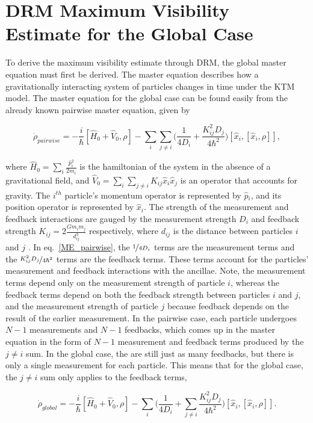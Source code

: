\documentclass[aps, prd, superscriptaddress,twocolumn,amsmath,amssymb,nofootinbib]{revtex4-1}
\newcommand{\beq}{\begin{equation}}
\newcommand{\eeq}{\end{equation}}
\newcommand{\h}[1]{\hat#1{}}
\begin{document}

\section{DRM Maximum Visibility Estimate for the Global Case}

To derive the maximum visibility estimate through DRM, the global master equation must first be derived. The master equation describes how a gravitationally interacting system of particles changes in time under the KTM model. The master equation for the global case can be found easily from the already known pairwise master equation, given by

\beq
 \dot\rho_{pairwise} = -\frac{i}{\hbar}[\h H_0+\h V_0, \rho] 
 -\sum_{i} \sum_{j\neq i}\bigg(\frac{1}{4D_i}+\frac{K_{ij}^2D_j}{4\hbar^2}\bigg)[\h x_i, [\h x_i,\rho]],
 \label{ME_pairwise}
 \eeq

where $\h H_0 = \sum_{i}\frac{\h p_i^2}{2m_i}$ is the hamiltonian of the system in the absence of a gravitational field, and $\h V_0 = \sum_{i}\sum_{j\neq i} K_{ij}\h x_i \h x_j$ is an operator that accounts for gravity. The $i^{th}$ particle's momentum operator is represented by $\h p_i$, and its position operator is represented by $\h x_i$. The strength of the measurement and feedback interactions are gauged by the measurement strength $D_i$ and feedback strength $K_{ij} = 2\frac{Gm_{i}m_{j}}{d_{ij}^3}$ respectively, where $d_{ij}$ is the distance between particles $i$ and $j$ \cite{P3}. In eq.~\eqref{ME_pairwise}, the $\nicefrac{1}{4D_i}$ terms are the measurement terms and the $\nicefrac{K_{ij}^2D_j}{4\hbar^2}$ terms are the feedback terms. These terms account for the particles' measurement and feedback interactions with the ancillae. Note, the measurement terms depend only on the measurement strength of particle $i$, whereas the feedback terms depend on both the feedback strength between particles $i$ and $j$, and the measurement strength of particle $j$ because feedback depends on the result of the earlier measurement.
In the pairwise case, each particle undergoes $N-1$ measurements and $N-1$ feedbacks, which comes up in the master equation in the form of $N-1$ measurement and feedback terms produced by the $j\neq i$ sum. In the global case, the are still just as many feedbacks, but there is only a single measurement for each particle. This means that for the global case, the $j \neq i$ sum only applies to the feedback terms,

\beq
 \dot\rho_{global} = -\frac{i}{\hbar}[\h H_0+\h V_0, \rho] 
 -\sum_{i} \bigg(\frac{1}{4D_i}+\sum_{j\neq i}\frac{K_{ij}^2D_j}{4\hbar^2}\bigg)[\h x_i, [\h x_i,\rho]].
  \label{ME_global}
 \eeq
\end{document}
